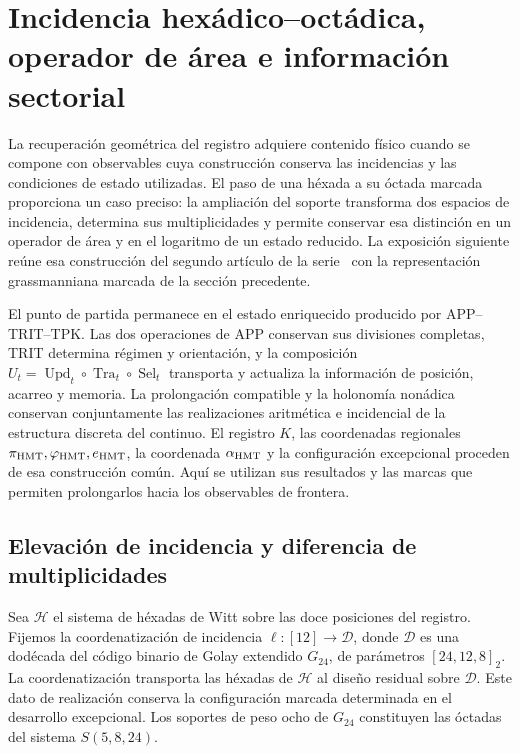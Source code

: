 \section{Incidencia hexádico--octádica, operador de área e información sectorial}
\label{rev4:ae:seccion}

La recuperación geométrica del registro adquiere contenido físico cuando se
compone con observables cuya construcción conserva las incidencias y las
condiciones de estado utilizadas. El paso de una héxada a su óctada marcada
proporciona un caso preciso: la ampliación del soporte transforma dos
espacios de incidencia, determina sus multiplicidades y permite conservar
esa distinción en un operador de área y en el logaritmo de un estado
reducido. La exposición siguiente reúne esa construcción del segundo
artículo de la serie~\cite{hmtII} con la representación grassmanniana
marcada de la sección precedente.

El punto de partida permanece en el estado enriquecido producido por
APP--TRIT--TPK. Las dos operaciones de APP conservan sus divisiones
completas, TRIT determina régimen y orientación, y la composición
\(U_t=\operatorname{Upd}_t\circ\operatorname{Tra}_t\circ
\operatorname{Sel}_t\) transporta y actualiza la información de posición,
acarreo y memoria. La prolongación compatible y la holonomía nonádica
conservan conjuntamente las realizaciones aritmética e incidencial de la
estructura discreta del continuo. El registro \(K\), las coordenadas
regionales \(\pi_{\rm HMT},\varphi_{\rm HMT},e_{\rm HMT}\), la
coordenada \(\alpha_{\rm HMT}\) y la configuración excepcional proceden
de esa construcción común. Aquí se utilizan sus resultados y las marcas
que permiten prolongarlos hacia los observables de frontera.

\subsection{Elevación de incidencia y diferencia de multiplicidades}

Sea \(\mathcal H\) el sistema de héxadas de Witt sobre las doce posiciones
del registro. Fijemos la coordenatización de incidencia \(\ell:[12]\to\mathscr D\),
donde \(\mathscr D\) es una dodécada del código binario de Golay extendido
\(G_{24}\), de parámetros \([24,12,8]_2\). La coordenatización transporta las
héxadas de \(\mathcal H\) al diseño residual sobre \(\mathscr D\).
Este dato de realización conserva la configuración marcada determinada
en el desarrollo excepcional. Los soportes de peso ocho de \(G_{24}\)
constituyen las óctadas del sistema \(S(5,8,24)\).

